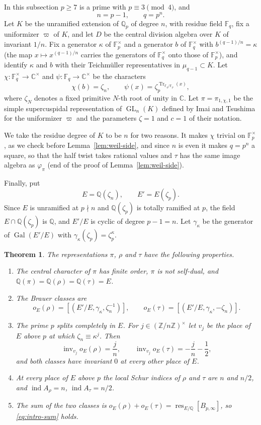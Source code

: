 \documentclass[a4paper,11pt]{amsart}
\newtheorem{theorem}{Theorem}[section]
\theoremstyle{definition}
\theoremstyle{remark}
\numberwithin{equation}{section}
\newcommand{\Q}{\mathbb{Q}}
\newcommand{\Z}{\mathbb{Z}}
\DeclareMathOperator{\inv}{inv}
\DeclareMathOperator{\res}{res}
\DeclareMathOperator{\Gal}{Gal}
\DeclareMathOperator{\GL}{GL}
\DeclareMathOperator{\Tr}{Tr}
\DeclareMathOperator{\ind}{ind}
\newcommand{\F}{\mathbb{F}}
\newcommand{\C}{\mathbb{C}}
\newcommand{\Bpinf}{B_{p,\infty}}
\begin{document}
In this subsection $p\ge7$ is a prime with $p\equiv3\pmod 4$, and
\[
 n=p-1,\qquad q=p^n.
\]
Let $K$ be the unramified extension of $\Q_p$ of degree $n$, with residue field $\F_q$, fix a uniformizer $\varpi$ of $K$, and let $D$ be the central division algebra over $K$ of invariant $1/n$. Fix a generator $\kappa$ of $\F_p^\times$ and a generator $b$ of $\F_q^\times$ with $b^{(q-1)/n}=\kappa$ (the map $x\mapsto x^{(q-1)/n}$ carries the generators of $\F_q^\times$ onto those of $\F_p^\times$), and identify $\kappa$ and $b$ with their Teichm\"uller representatives in $\mu_{q-1}\subset K$. Let $\chi\colon \F_q^\times\to\C^\times$ and $\psi\colon \F_q\to\C^\times$ be the characters
\[
 \chi(b)=\zeta_n,\qquad \psi(x)=\zeta_p^{\Tr_{\F_q/\F_p}(x)},
\]
where $\zeta_N$ denotes a fixed primitive $N$-th root of unity in $\C$. Let $\pi=\pi_{1,\chi,1}$ be the simple supercuspidal representation of $\GL_n(K)$ defined by Imai and Tsushima \cite[\S5.1]{IT20} for the uniformizer $\varpi$ and the parameters $\zeta=1$ and $c=1$ of their notation.

We take the residue degree of $K$ to be $n$ for two reasons. It makes $\chi$ trivial on $\F_p^\times$, as we check before Lemma~\ref{lem:weil-side}, and since $n$ is even it makes $q=p^n$ a square, so that the half twist takes rational values and $\tau$ has the same image algebra as $\varphi_\pi$ (end of the proof of Lemma~\ref{lem:weil-side}).

Finally, put
\[
 E=\Q(\zeta_n),\qquad E'=E(\zeta_p).
\]
Since $E$ is unramified at $p\nmid n$ and $\Q(\zeta_p)$ is totally ramified at $p$, the field $E\cap\Q(\zeta_p)$ is $\Q$, and $E'/E$ is cyclic of degree $p-1=n$. Let $\gamma_\kappa$ be the generator of $\Gal(E'/E)$ with $\gamma_\kappa(\zeta_p)=\zeta_p^\kappa$.

\begin{theorem}\label{thm:family}
The representations $\pi$, $\rho$ and $\tau$ have the following properties.
\begin{enumerate}
\item[(i)] The central character of $\pi$ has finite order, $\pi$ is not self-dual, and $\Q(\pi)=\Q(\rho)=\Q(\tau)=E$.
\item[(ii)] The Brauer classes are
\[
 o_E(\rho)=[(E'/E,\gamma_\kappa,\zeta_n^{-1})],\qquad o_E(\tau)=[(E'/E,\gamma_\kappa,-\zeta_n)].
\]
\item[(iii)] The prime $p$ splits completely in $E$. For $j\in(\Z/n\Z)^\times$ let $v_j$ be the place of $E$ above $p$ at which $\zeta_n\equiv \kappa^j$. Then
\[
 \inv_{v_j}o_E(\rho)=\frac jn,\qquad \inv_{v_j}o_E(\tau)=-\frac jn-\frac12,
\]
and both classes have invariant $0$ at every other place of $E$.
\item[(iv)] At every place of $E$ above $p$ the local Schur indices of $\rho$ and $\tau$ are $n$ and $n/2$, and $\ind A_\rho=n$, $\ind A_\tau=n/2$.
\item[(v)] The sum of the two classes is $o_E(\rho)+o_E(\tau)=\res_{E/\Q}[\Bpinf]$, so \eqref{eq:intro-sum} holds.
\end{enumerate}
\end{theorem}
\end{document}
